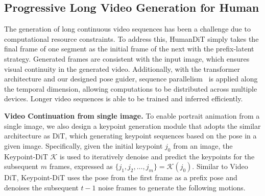 
\subsection{Progressive Long Video Generation for Human}
\label{subsec:infer}

The generation of long continuous video sequences has been a challenge due to computational resource constraints. To address this, HumanDiT simply takes the final frame of one segment as the initial frame of the next with the prefix-latent strategy. Generated frames are consistent with the input image, which ensures visual continuity in the generated video. Additionally, with the transformer architecture and our designed pose guider, sequence parallelism~\cite{li2021sequence} is applied along the temporal dimension, allowing computations to be distributed across multiple devices. Longer video sequences is able to be trained and inferred efficiently. 


\noindent\textbf{Video Continuation from single image.}
To enable portrait animation from a single image, we also design a keypoint generation module that adopts the similar architecture as DiT, which generating keypoint sequences based on the pose in a given image. Specifically, given the initial keypoint $ j_0 $ from an image, the Keypoint-DiT $ \mathcal{K} $ is used to iteratively denoise and predict the keypoints for the subsequent $ m $ frames, expressed as 
$
    \{ j_1, j_2, \dots, j_m \} = \mathcal{K}(j_0).
$ Similar to Video DiT, Keypoint-DiT uses the pose from the first frame as a prefix pose and denoises the subsequent $t-1$ noise frames to generate the following motions.

